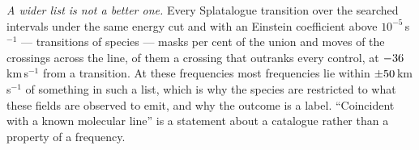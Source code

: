 \emph{A wider list is not a better one.} Every Splatalogue transition over the
searched intervals under the same energy cut and with an Einstein coefficient
above $10^{-5}$\,s$^{-1}$ --- \MaskDbTrans{} transitions of \MaskDbCarriers{}
species --- masks \MaskDbPctUnion{} per cent of the union and moves
\FrFullNFlip{} of the \NCross{} crossings across the line,
\FrFullNFlipRankWord{} of them a crossing that outranks every control, at
$-36$\,km\,s$^{-1}$ from a \FrFullFlipRankChem{} transition. At
these frequencies most frequencies lie within $\pm50$\,km\,s$^{-1}$
of something in such a list, which is why the species are restricted to what
these fields are observed to emit, and why the outcome is a label.
``Coincident with a known molecular line'' is a statement about a catalogue
rather than a property of a frequency.
